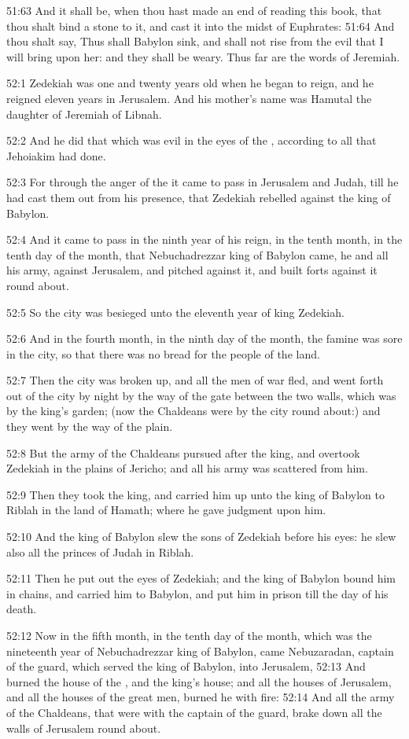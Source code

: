 51:63 And it shall be, when thou hast made an end of reading this book, that thou shalt bind a stone to it, and cast it into the midst of Euphrates: 51:64 And thou shalt say, Thus shall Babylon sink, and shall not rise from the evil that I will bring upon her: and they shall be weary. Thus far are the words of Jeremiah.

52:1 Zedekiah was one and twenty years old when he began to reign, and he reigned eleven years in Jerusalem. And his mother's name was Hamutal the daughter of Jeremiah of Libnah.

52:2 And he did that which was evil in the eyes of the \LORD, according to all that Jehoiakim had done.

52:3 For through the anger of the \LORD it came to pass in Jerusalem and Judah, till he had cast them out from his presence, that Zedekiah rebelled against the king of Babylon.

52:4 And it came to pass in the ninth year of his reign, in the tenth month, in the tenth day of the month, that Nebuchadrezzar king of Babylon came, he and all his army, against Jerusalem, and pitched against it, and built forts against it round about.

52:5 So the city was besieged unto the eleventh year of king Zedekiah.

52:6 And in the fourth month, in the ninth day of the month, the famine was sore in the city, so that there was no bread for the people of the land.

52:7 Then the city was broken up, and all the men of war fled, and went forth out of the city by night by the way of the gate between the two walls, which was by the king's garden; (now the Chaldeans were by the city round about:) and they went by the way of the plain.

52:8 But the army of the Chaldeans pursued after the king, and overtook Zedekiah in the plains of Jericho; and all his army was scattered from him.

52:9 Then they took the king, and carried him up unto the king of Babylon to Riblah in the land of Hamath; where he gave judgment upon him.

52:10 And the king of Babylon slew the sons of Zedekiah before his eyes: he slew also all the princes of Judah in Riblah.

52:11 Then he put out the eyes of Zedekiah; and the king of Babylon bound him in chains, and carried him to Babylon, and put him in prison till the day of his death.

52:12 Now in the fifth month, in the tenth day of the month, which was the nineteenth year of Nebuchadrezzar king of Babylon, came Nebuzaradan, captain of the guard, which served the king of Babylon, into Jerusalem, 52:13 And burned the house of the \LORD, and the king's house; and all the houses of Jerusalem, and all the houses of the great men, burned he with fire: 52:14 And all the army of the Chaldeans, that were with the captain of the guard, brake down all the walls of Jerusalem round about.

